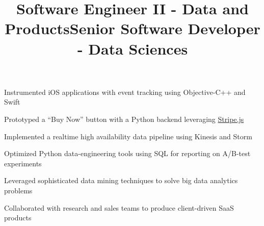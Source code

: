 \documentclass[12pt, tweaklist, line]{res}
\let\tempone\itemize
\let\temptwo\enditemize
\renewenvironment{itemize}{\tempone\vspace{-.15in}\setlength{\topsep}{0pt}\setlength{\itemsep}{3pt}\vspace{-.15in}}{\temptwo}
\def\Cplusplus{C++}
\begin{document}
\begin{resume}
\title{Software Engineer II - Data and Products}
\begin{position}
\begin{itemize}
\item Instrumented iOS applications with event tracking using Objective-C++ and Swift
\item Prototyped a ``Buy Now'' button with a Python backend leveraging \href{https://stripe.com/}{Stripe.js} %
\item Implemented a realtime high availability data pipeline using Kinesis and Storm
\item Optimized Python data-engineering tools using SQL for reporting on A/B-test experiments %
\end{itemize}
\end{position}

\title{Senior Software Developer - Data Sciences}
\begin{position}
\begin{itemize}
\item Leveraged sophisticated data mining techniques to solve big data analytics problems
\item Collaborated with research and sales teams to produce client-driven SaaS products
\end{itemize}
\end{position}


\end{resume}
\end{document}
